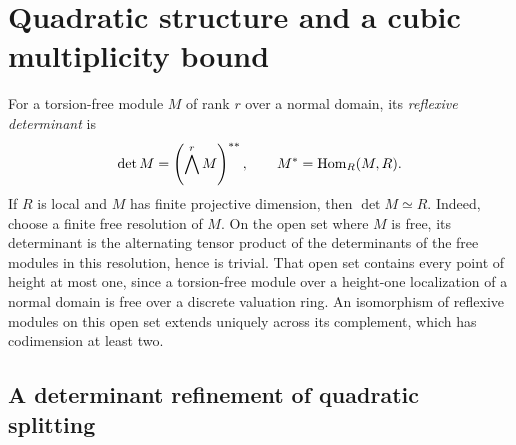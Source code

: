 \section{Quadratic structure and a cubic multiplicity bound}\label{ranks}
For a torsion-free module $M$ of rank $r$ over a normal
domain, its \emph{reflexive determinant} is
\[
 \det M=\left(\bigwedge^r M\right)^{**},
 \qquad M^*=\operatorname{Hom}_R(M,R).
\]
If $R$ is local and $M$ has finite projective dimension, then
$\det M\simeq R$.  Indeed, choose a finite free resolution of $M$.
On the open set where $M$ is free, its determinant is the alternating
tensor product of the determinants of the free modules in this
resolution, hence is trivial.  That open set contains every point
of height at most one, since a torsion-free module over a height-one
localization of a normal domain is free over a discrete valuation ring.
An isomorphism of reflexive modules on this open set extends uniquely
across its complement, which has codimension at least two.

\subsection{A determinant refinement of quadratic splitting}

